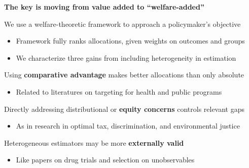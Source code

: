 \documentclass[t,aspectratio=169,11pt,presentation]{beamer}
\newenvironment{wideitemize}{\itemize\addtolength{\itemsep}{14pt}}{\enditemize}
\newenvironment{wideenumerate}{\enumerate\addtolength{\itemsep}{14pt}}{\endenumerate}
\begin{document}
\begin{frame}{\textbf{The key is moving from value added to ``welfare-added''} }

\begin{wideitemize}
    \item We use a welfare-theoretic framework to approach a policymaker's objective
        \begin{itemize}
            \item<2-> Framework fully ranks allocations, given weights on outcomes and groups 
            \item<3-> We characterize three gains from including heterogeneity in estimation
    \end{itemize}
    \vspace{12pt}
\end{wideitemize} 
    
    \begin{wideenumerate}
    \item<4-> Using \textbf{comparative advantage} makes better allocations than only absolute
    \begin{itemize}
        \item<5-> Related to literatures on targeting for health and public programs
    \end{itemize}
    \item<6-> Directly addressing distributional or \textbf{equity concerns} controls relevant gaps
    \begin{itemize}
        \item<7-> As in research in optimal tax, discrimination, and environmental justice 
    \end{itemize}
    \item<8-> Heterogeneous estimators may be more \textbf{externally valid}
    \begin{itemize}
        \item<9-> Like papers on drug trials and selection on unobservables
    \end{itemize}
    \end{wideenumerate}

\end{frame}
\end{document}
